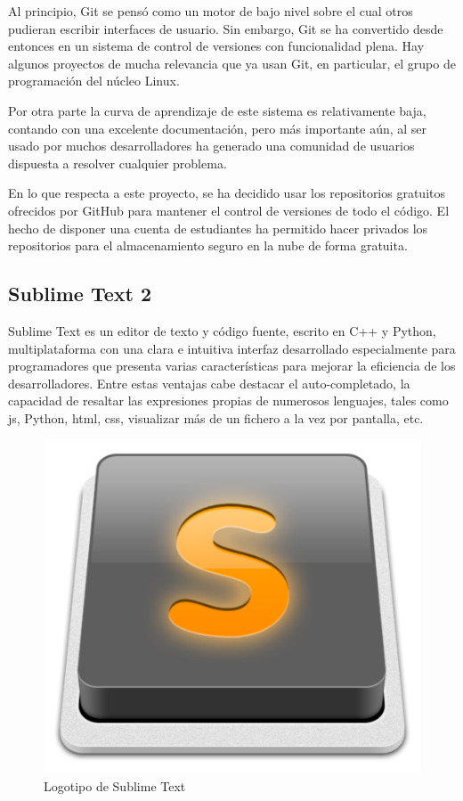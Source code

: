 Al principio, Git se pensó como un motor de bajo nivel sobre el cual otros pudieran escribir interfaces de usuario. Sin embargo, Git se ha convertido desde entonces en un sistema de control de versiones con funcionalidad plena. Hay algunos proyectos de mucha relevancia que ya usan Git, en particular, el grupo de programación del núcleo Linux.

Por otra parte la curva de aprendizaje de este sistema es relativamente baja, contando con una excelente documentación, pero más importante aún, al ser usado por muchos desarrolladores ha generado una comunidad de usuarios dispuesta a resolver cualquier problema.

En lo que respecta a este proyecto, se ha decidido usar los repositorios gratuitos ofrecidos por GitHub\cite{Github} para mantener el control de versiones de todo el código. El hecho de disponer una cuenta de estudiantes ha permitido hacer privados los repositorios para el almacenamiento seguro en la nube de forma gratuita.

\subsection{Sublime Text 2}

Sublime Text\cite{SublimeText} es un editor de texto y código fuente, escrito en C++ y Python, multiplataforma con una clara e intuitiva interfaz desarrollado especialmente para programadores que presenta varias características para mejorar la eficiencia de los desarrolladores. Entre estas ventajas cabe destacar el auto-completado, la capacidad de resaltar las expresiones propias de numerosos lenguajes, tales como \acrlong{js}, Python, \acrshort{html}, \acrshort{css}, visualizar más de un fichero a la vez por pantalla, etc. 

\begin{figure}[!htp]
	 \centering
	 \includegraphics[scale=0.2]{fig/sublime_text_logo}
	 \caption{Logotipo de Sublime Text}
\end{figure}


